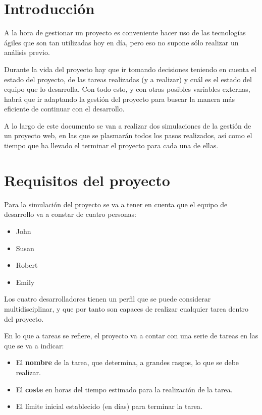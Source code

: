 \documentclass{\ClassPath/viu-tfm-template}
\begin{document}
    \graphicspath{{../VIU_TFM_LaTeX_template/}}

    \coverpage

    \tableofcontents

\chapter{Introducción}

A la hora de gestionar un proyecto es conveniente hacer uso de las tecnologías ágiles que son tan utilizadas hoy en día, pero eso no supone sólo realizar un análisis previo.

Durante la vida del proyecto hay que ir tomando decisiones teniendo en cuenta el estado del proyecto, de las tareas realizadas (y a realizar) y cuál es el estado del equipo que lo desarrolla. Con todo esto, y con otras posibles variables externas, habrá que ir adaptando la gestión del proyecto para buscar la manera más eficiente de continuar con el desarrollo.

A lo largo de este documento se van a realizar dos simulaciones de la gestión de un proyecto web, en las que se plasmarán todos los pasos realizados, así como el tiempo que ha llevado el terminar el proyecto para cada una de ellas.


\chapter{Requisitos del proyecto}

Para la simulación del proyecto se va a tener en cuenta que el equipo de desarrollo va a constar de cuatro personas:

\begin{itemize}
    \item John
    \item Susan
    \item Robert
    \item Emily
\end{itemize}

Los cuatro desarrolladores tienen un perfil que se puede considerar multidisciplinar, y que por tanto son capaces de realizar cualquier tarea dentro del proyecto.

En lo que a tareas se refiere, el proyecto va a contar con una serie de tareas en las que se va a indicar:
\begin{itemize}
    \item El \textbf{nombre} de la tarea, que determina, a grandes rasgos, lo que se debe realizar.
    \item El \textbf{coste} en horas del tiempo estimado para la realización de la tarea.
    \item El límite inicial establecido (en días) para terminar la tarea.
\end{itemize}
\end{document}
